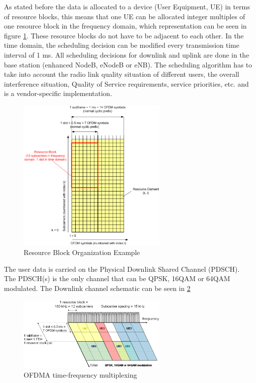 As stated before the data is allocated to a device (User Equipment, UE) in terms
of resource blocks, this means that one UE can be allocated integer multiples of
one resource block in the frequency domain, which representation can be seen in
figure \ref{fig:ofdmresblk}. These resource blocks do not have to be adjacent to
each other. In the time domain, the scheduling decision can be modified every
transmission time interval of 1 ms. All scheduling decisions for downlink and
uplink are done in the base station (enhanced NodeB, eNodeB or eNB). The
scheduling algorithm has to take into account the radio link quality situation
of different users, the overall interference situation, Quality of Service
requirements, service priorities, etc. and is a vendor-specific implementation.\\

\begin{figure}[htbp]
    \centering
    \includegraphics[width=0.65\textwidth]{./figures/ofdm_resource_block}
    \caption{ Resource Block Organization Example
    \label{fig:ofdmresblk}}
\end{figure}

The user data is carried on the Physical Downlink Shared Channel (PDSCH). The
PDSCH(s) is the only channel that can be QPSK, 16QAM or 64QAM modulated. The
Downlink channel schematic can be seen in \ref{fig:dlchann}

\begin{figure}[htbp]
    \centering
    \includegraphics[width=0.65\textwidth]{./figures/downlink_channels}
    \caption{ OFDMA time-frequency multiplexing
    \label{fig:dlchann}}
\end{figure}


